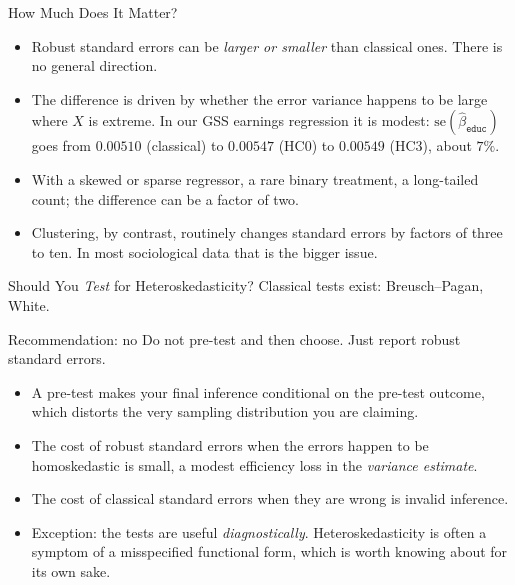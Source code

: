 \documentclass[aspectratio=169,11pt,xcolor=dvipsnames]{beamer}
\newcommand{\SE}{\mathrm{se}}
\begin{document}
\begin{frame}{How Much Does It Matter?}
\begin{itemize}\itemsep4pt
  \item Robust standard errors can be \emph{larger or smaller} than classical
        ones. There is no general direction.
  \item The difference is driven by whether the error variance happens to be
        large where $X$ is extreme. In our GSS earnings regression it is modest:
        $\SE(\hat\beta_{\texttt{educ}})$ goes from $0.00510$ (classical) to
        $0.00547$ (HC0) to $0.00549$ (HC3), about $7\%$.
  \item With a skewed or sparse regressor, a rare binary treatment, a
        long-tailed count; the difference can be a factor of two.
  \item \alert{Clustering, by contrast, routinely changes standard errors by
        factors of three to ten.} In most sociological data that is the bigger
        issue.
\end{itemize}
\end{frame}

\begin{frame}{Should You \emph{Test} for Heteroskedasticity?}
Classical tests exist: Breusch--Pagan, White.
\vskip3pt
\begin{alertblock}{Recommendation: no}
Do not pre-test and then choose. Just report robust standard errors.
\end{alertblock}
\begin{itemize}\itemsep3pt
  \item A pre-test makes your final inference conditional on the pre-test outcome,
        which distorts the very sampling distribution you are claiming.
  \item The cost of robust standard errors when the errors happen to be
        homoskedastic is small, a modest efficiency loss in the \emph{variance
        estimate}.
  \item The cost of classical standard errors when they are wrong is invalid
        inference.
  \item Exception: the tests are useful \emph{diagnostically}. Heteroskedasticity
        is often a symptom of a misspecified functional form, which is worth
        knowing about for its own sake.
\end{itemize}
\end{frame}

\end{document}
